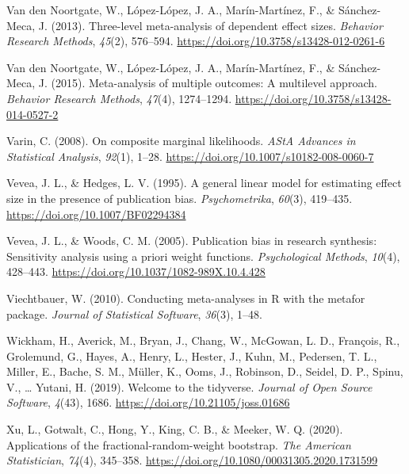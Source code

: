 \documentclass[
  american,
  man, donotrepeattitle,floatsintext]{apa7}
\newlength{\cslhangindent}
\newenvironment{CSLReferences}[2] %
 {\begin{list}{}{%
  \setlength{\itemindent}{0pt}
  \setlength{\leftmargin}{0pt}
  \setlength{\parsep}{0pt}
  \ifodd #1
   \setlength{\leftmargin}{\cslhangindent}
   \setlength{\itemindent}{-1\cslhangindent}
  \fi
  \setlength{\itemsep}{#2\baselineskip}}}
 {\end{list}}
\begin{document}
\begin{CSLReferences}{1}{0}
Van den Noortgate, W., López-López, J. A., Marín-Martínez, F., \& Sánchez-Meca, J. (2013). Three-level meta-analysis of dependent effect sizes. \emph{Behavior Research Methods}, \emph{45}(2), 576--594. \url{https://doi.org/10.3758/s13428-012-0261-6}

Van den Noortgate, W., López-López, J. A., Marín-Martínez, F., \& Sánchez-Meca, J. (2015). Meta-analysis of multiple outcomes: A multilevel approach. \emph{Behavior Research Methods}, \emph{47}(4), 1274--1294. \url{https://doi.org/10.3758/s13428-014-0527-2}

Varin, C. (2008). On composite marginal likelihoods. \emph{AStA Advances in Statistical Analysis}, \emph{92}(1), 1--28. \url{https://doi.org/10.1007/s10182-008-0060-7}

Vevea, J. L., \& Hedges, L. V. (1995). A general linear model for estimating effect size in the presence of publication bias. \emph{Psychometrika}, \emph{60}(3), 419--435. \url{https://doi.org/10.1007/BF02294384}

Vevea, J. L., \& Woods, C. M. (2005). Publication bias in research synthesis: Sensitivity analysis using a priori weight functions. \emph{Psychological Methods}, \emph{10}(4), 428--443. \url{https://doi.org/10.1037/1082-989X.10.4.428}

Viechtbauer, W. (2010). {Conducting meta-analyses in R with the metafor package}. \emph{Journal of Statistical Software}, \emph{36}(3), 1--48.

Wickham, H., Averick, M., Bryan, J., Chang, W., McGowan, L. D., François, R., Grolemund, G., Hayes, A., Henry, L., Hester, J., Kuhn, M., Pedersen, T. L., Miller, E., Bache, S. M., Müller, K., Ooms, J., Robinson, D., Seidel, D. P., Spinu, V., \ldots{} Yutani, H. (2019). Welcome to the {tidyverse}. \emph{Journal of Open Source Software}, \emph{4}(43), 1686. \url{https://doi.org/10.21105/joss.01686}

Xu, L., Gotwalt, C., Hong, Y., King, C. B., \& Meeker, W. Q. (2020). Applications of the fractional-random-weight bootstrap. \emph{The American Statistician}, \emph{74}(4), 345--358. \url{https://doi.org/10.1080/00031305.2020.1731599}


\end{CSLReferences}
\end{document}
